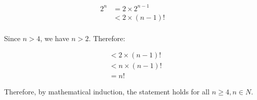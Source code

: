 \documentclass{article}
\begin{document}
\begin{align*}
    2^n & = 2 \times 2^{n-1} \\
    & < 2 \times (n-1)! \\
\end{align*}

Since $n > 4$, we have $n > 2$. Therefore:

\begin{align*}
    & < 2 \times (n-1)! \\
    & < n \times (n-1)! \\
    & = n!
\end{align*}

Therefore, by mathematical induction, the statement holds for all $n \geq 4, n \in N$.
\end{document}

